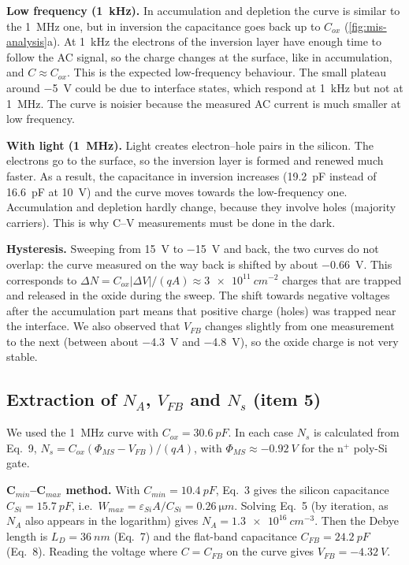 \textbf{Low frequency (\SI{1}{kHz}).} In accumulation and depletion the curve is similar to the
\SI{1}{MHz} one, but in inversion the capacitance goes back up to $C_{ox}$
(\cref{fig:mis-analysis}a). At \SI{1}{kHz} the electrons of the inversion layer have enough time to
follow the AC signal, so the charge changes at the surface, like in accumulation, and $C\approx C_{ox}$.
This is the expected low-frequency behaviour. The small plateau around \SI{-5}{V} could be due to
interface states, which respond at \SI{1}{kHz} but not at \SI{1}{MHz}. The curve is noisier because the
measured AC current is much smaller at low frequency.

\textbf{With light (\SI{1}{MHz}).} Light creates electron--hole pairs in the silicon. The electrons
go to the surface, so the inversion layer is formed and renewed much faster. As a result, the
capacitance in inversion increases (\SI{19.2}{pF} instead of \SI{16.6}{pF} at \SI{+10}{V}) and the curve
moves towards the low-frequency one. Accumulation and depletion hardly change, because they involve
holes (majority carriers). This is why C--V measurements must be done in the dark.

\textbf{Hysteresis.} Sweeping from \SI{+15}{V} to \SI{-15}{V} and back, the two curves do not
overlap: the curve measured on the way back is shifted by about \SI{-0.66}{V}. This corresponds to
$\Delta N=C_{ox}|\Delta V|/(qA)\approx\SI{3e11}{cm^{-2}}$ charges that are trapped and released in the
oxide during the sweep. The shift towards negative voltages after the accumulation part means that
positive charge (holes) was trapped near the interface. We also observed that $V_{FB}$ changes slightly
from one measurement to the next (between about \SI{-4.3}{V} and \SI{-4.8}{V}), so the oxide charge is
not very stable.

\subsection{Extraction of $N_A$, $V_{FB}$ and $N_s$ (item 5)}\label{sec:mis-extraction}
We used the \SI{1}{MHz} curve with $C_{ox}=\SI{30.6}{pF}$. In each case $N_s$ is calculated from
Eq.~9, $N_s=C_{ox}(\Phi_{MS}-V_{FB})/(qA)$, with $\Phi_{MS}\approx\SI{-0.92}{V}$ for the n$^+$ poly-Si gate.

\textbf{C$_{min}$--C$_{max}$ method.} With $C_{min}=\SI{10.4}{pF}$, Eq.~3 gives the silicon capacitance
$C_{Si}=\SI{15.7}{pF}$, i.e.\ $W_{max}=\varepsilon_{Si}A/C_{Si}=\SI{0.26}{\micro m}$. Solving Eq.~5 (by
iteration, as $N_A$ also appears in the logarithm) gives $N_A=\SI{1.3e16}{cm^{-3}}$. Then the Debye
length is $L_D=\SI{36}{nm}$ (Eq.~7) and the flat-band capacitance $C_{FB}=\SI{24.2}{pF}$ (Eq.~8).
Reading the voltage where $C=C_{FB}$ on the curve gives $V_{FB}=\SI{-4.32}{V}$.

